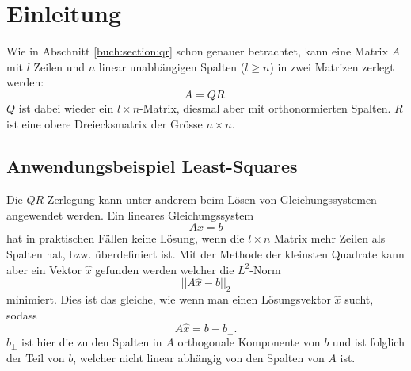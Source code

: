 %
%
%
\section{Einleitung\label{qr:section:einleitung}}
Wie in Abschnitt \ref{buch:section:qr} schon genauer betrachtet, kann eine Matrix $A$ mit $l$ Zeilen und $n$ linear unabhängigen Spalten ($l\ge n$) in zwei Matrizen zerlegt werden:
\begin{equation*}
A=QR.
\end{equation*}
$Q$ ist dabei wieder ein $l\times n$-Matrix, diesmal aber mit orthonormierten Spalten.
$R$ ist eine obere Dreiecksmatrix der Grösse $n\times n$.

\subsection{Anwendungsbeispiel Least-Squares\label{qr:section:ls}}
Die $QR$-Zerlegung kann unter anderem beim Lösen von Gleichungssystemen angewendet werden.
Ein lineares Gleichungssystem
\begin{equation}
Ax=b\label{qr:sle}
\end{equation}
hat in praktischen Fällen keine Lösung, wenn die $l\times n$ Matrix mehr Zeilen als Spalten hat, bzw. überdefiniert ist.
Mit der Methode der kleinsten Quadrate kann aber ein Vektor $\hat{x}$ gefunden werden welcher die $L^2$-Norm
\begin{equation*}
||A\hat{x}-b||_2
\end{equation*}
minimiert.
Dies ist das gleiche, wie wenn man einen Lösungsvektor $\hat{x}$ sucht, sodass
\begin{equation*}
A\hat{x}=b-b_{\perp}.
\end{equation*}
$b_{\perp}$ ist hier die zu den Spalten in $A$ orthogonale Komponente von $b$ und ist folglich der Teil von $b$, welcher nicht linear abhängig von den Spalten von $A$ ist.

